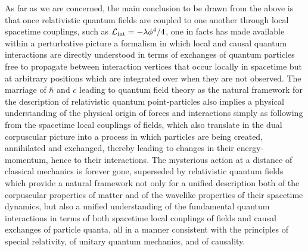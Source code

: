 \documentclass[a4paper,11pt]{article}
\begin{document}
\vspace{5pt}

As far as we are concerned, the main conclusion to be drawn from the above
is that once relativistic quantum fields are coupled to one another
through local spacetime couplings, such as 
${\cal L}_{\rm int}=-\lambda\phi^4/4$, one in facts has made available
within a perturbative picture a formalism in which local and causal quantum 
interactions are directly understood in terms of exchanges of quantum 
particles free to propagate between interaction vertices that occur
locally in spacetime but at arbitrary positions which are integrated over
when they are not observed. The marriage of $\hbar$ and $c$ leading
to quantum field theory as the natural framework for the description
of relativistic quantum point-particles also implies a physical understanding
of the physical origin of forces and interactions simply as following
from the spacetime local couplings of fields, which also translate in
the dual corpuscular picture into a process in which particles are being 
created, annihilated and exchanged, thereby lea\-ding to 
changes in their energy-momentum, hence to their interactions.
The mysterious action at a distance of classical mechanics is forever gone,
superseded by relativistic quantum fields which provide a natural framework
not only for a unified description both of the corpuscular properties of matter
and of the wavelike properties of their spacetime dynamics, but also a
unified understanding of the fundamental quantum interactions in terms of
both spacetime local couplings of fields and causal exchanges of particle 
quanta, all in a manner consistent with the principles of special relativity,
of unitary quantum mechanics, and of causality.

\vspace{5pt}
\end{document}
